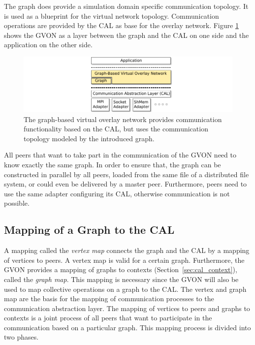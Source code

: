 The graph does provide a simulation domain specific communication
topology.  It is used as a blueprint for the virtual network topology.
Communication operations are provided by the CAL as base for the
overlay network.  Figure \ref{fig:gvon} shows the GVON as a layer
between the graph and the CAL on one side and the application on the other
side.

\begin{figure}[H]
  \centering \includegraphics[width=\textwidth]{graphics/30_gvon}
  \caption{The graph-based virtual overlay network provides
    communication functionality based on the CAL, but uses the
    communication topology modeled by the introduced graph.}
  \label{fig:gvon}
\end{figure}

\noindent All peers that want to take part in the communication of the GVON need
to know exactly the same graph. In order to ensure that, the graph can be
constructed in parallel by all peers, loaded from the same file of a
distributed file system, or could even be delivered by a master
peer. Furthermore, peers need to use the same adapter configuring its
CAL, otherwise communication is not possible.


\subsection{Mapping of a Graph to the CAL}
\label{sec:mapping}
A mapping called the \emph{vertex map} connects the graph and the CAL
by a mapping of vertices to peers.  A vertex map is valid for a
certain graph. Furthermore, the GVON provides a mapping of graphs to
contexts (Section~\ref{sec:cal_context}), called the \emph{graph
  map}. This mapping is necessary since the GVON will also be used to
map collective operations on a graph to the CAL.  The vertex and graph
map are the basis for the mapping of communication processes to the
communication abstraction layer.  The mapping of vertices to peers and
graphs to contexts is a joint process of all peers that want to
participate in the communication based on a particular graph. This
mapping process is divided into two phases.

